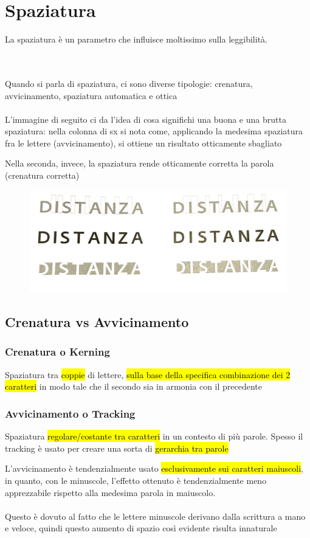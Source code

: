  \section{Spaziatura}
La spaziatura è un parametro che influisce moltissimo sulla leggibilità. 
    
\\\\Quando si parla di spaziatura, ci sono diverse tipologie: crenatura, avvicinamento, spaziatura automatica e ottica
\\\\
L'immagine di seguito ci da l'idea di cosa significhi una buona e una brutta spaziatura: nella colonna di sx si nota come, applicando la medesima spaziatura fra le lettere (avvicinamento), si ottiene un risultato otticamente sbagliato

Nella seconda, invece, la spaziatura rende otticamente corretta la parola (crenatura corretta)
\begin{figure}[H]
    \centering
    \includegraphics[width=0.2\linewidth]{blocco_2 - spiegazioni teorico-pratiche/imgs/f7.jpg}
\end{figure}
    \subsection{Crenatura vs Avvicinamento}
    \subsubsection{Crenatura o Kerning}
    Spaziatura tra \hl{coppie} di lettere, \hl{sulla base della specifica combinazione dei 2 caratteri} in modo tale che il secondo sia in armonia con il precedente 
    \subsubsection{Avvicinamento o Tracking}
    Spaziatura \hl{regolare/costante tra caratteri} in un contesto di più parole. Spesso il tracking è usato per creare una sorta di \hl{gerarchia tra parole}

    \begin{mdframed}[style=mystyle,frametitle=Tip]
        L'avvicinamento è tendenzialmente usato \hl{esclusivamente sui caratteri maiuscoli}, in quanto, con le minuscole, l'effetto ottenuto è tendenzialmente meno apprezzabile rispetto alla medesima parola in maiuscolo.
        \\\\
        Questo è dovuto al fatto che le lettere minuscole derivano dalla scrittura a mano e veloce, quindi questo aumento di spazio così evidente risulta innaturale
    \end{mdframed}

